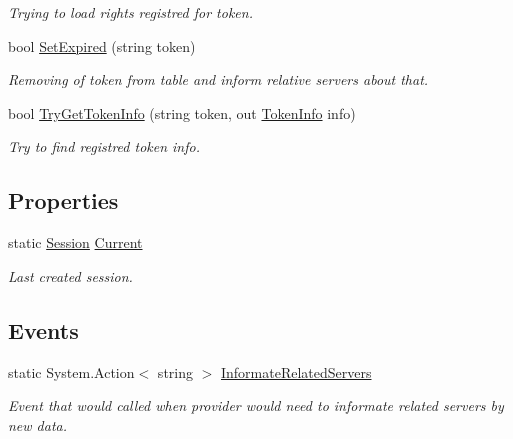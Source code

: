 \begin{DoxyCompactItemize}
\begin{DoxyCompactList}\small\item\em Trying to load rights registred for token. \end{DoxyCompactList}\item 
bool \mbox{\hyperlink{class_authority_controller_1_1_session_a811b23b70e61ac567ec8eeb54641ffcd}{Set\+Expired}} (string token)
\begin{DoxyCompactList}\small\item\em Removing of token from table and inform relative servers about that. \end{DoxyCompactList}\item 
bool \mbox{\hyperlink{class_authority_controller_1_1_session_abdd6c48f989b28cc9b3838dbe569edc6}{Try\+Get\+Token\+Info}} (string token, out \mbox{\hyperlink{class_authority_controller_1_1_data_1_1_token_info}{Token\+Info}} info)
\begin{DoxyCompactList}\small\item\em Try to find registred token info. \end{DoxyCompactList}\end{DoxyCompactItemize}
\subsection*{Properties}
\begin{DoxyCompactItemize}
\item 
static \mbox{\hyperlink{class_authority_controller_1_1_session}{Session}} \mbox{\hyperlink{class_authority_controller_1_1_session_a20d84345a3843b7a1b340887bb961f7c}{Current}}
\begin{DoxyCompactList}\small\item\em Last created session. \end{DoxyCompactList}\end{DoxyCompactItemize}
\subsection*{Events}
\begin{DoxyCompactItemize}
\item 
static System.\+Action$<$ string $>$ \mbox{\hyperlink{class_authority_controller_1_1_session_abbd978421ebd42315bde41126231ac18}{Informate\+Related\+Servers}}
\begin{DoxyCompactList}\small\item\em Event that would called when provider would need to informate related servers by new data. \end{DoxyCompactList}\end{DoxyCompactItemize}
